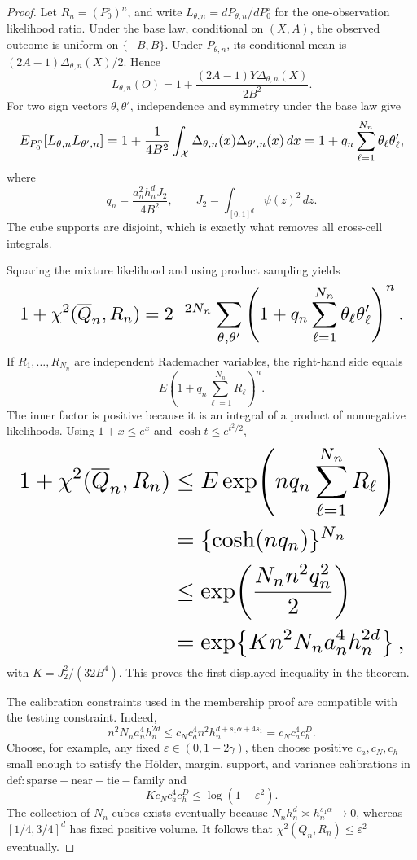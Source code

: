 \documentclass{article}
\begin{document}
\begin{proof}
Let \(R_n=(P_0^\circ)^n\), and write \(L_{\theta,n}=dP_{\theta,n}/dP_0^\circ\) for the one-observation likelihood ratio.  Under the base law, conditional on \((X,A)\), the observed outcome is uniform on \(\{-B,B\}\).  Under \(P_{\theta,n}\), its conditional mean is \((2A-1)\Delta_{\theta,n}(X)/2\).  Hence
\[
 L_{\theta,n}(O)
 =1+\frac{(2A-1)Y\Delta_{\theta,n}(X)}{2B^2}.
\]
For two sign vectors \(\theta,\theta'\), independence and symmetry under the base law give
\[
\makebox[\linewidth][c]{\resizebox{0.98\linewidth}{!}{\(\displaystyle E_{P_0^\circ}[L_{\theta,n}L_{\theta',n}]
 =1+\frac1{4B^2}\int_{\mathcal X}
 \Delta_{\theta,n}(x)\Delta_{\theta',n}(x)\,dx
 =1+q_n\sum_{\ell=1}^{N_n}\theta_\ell\theta'_\ell,\)}}
\]
where
\[
 q_n=\frac{a_n^2h_n^dJ_2}{4B^2},
 \qquad
 J_2=\int_{[0,1]^d}\psi(z)^2\,dz.
\]
The cube supports are disjoint, which is exactly what removes all cross-cell integrals.

Squaring the mixture likelihood and using product sampling yields
\[
\makebox[\linewidth][c]{\resizebox{0.98\linewidth}{!}{\(\displaystyle 1+\chi^2(\overline Q_n,R_n)
 =2^{-2N_n}\sum_{\theta,\theta'}
 \left(1+q_n\sum_{\ell=1}^{N_n}\theta_\ell\theta'_\ell\right)^n.\)}}
\]
If \(R_1,\ldots,R_{N_n}\) are independent Rademacher variables, the right-hand side equals
\[
 E\left(1+q_n\sum_{\ell=1}^{N_n}R_\ell\right)^n.
\]
The inner factor is positive because it is an integral of a product of nonnegative likelihoods.  Using \(1+x\le e^x\) and \(\cosh t\le e^{t^2/2}\),
\[
\makebox[\linewidth][c]{\resizebox{0.98\linewidth}{!}{\(\displaystyle \begin{aligned}
 1+\chi^2(\overline Q_n,R_n)
 &\le E\exp\!\left(nq_n\sum_{\ell=1}^{N_n}R_\ell\right)\\
 &=\{\cosh(nq_n)\}^{N_n}\\
 &\le\exp\!\left(\frac{N_nn^2q_n^2}{2}\right)\\
 &=\exp\!\left\{K n^2N_na_n^4h_n^{2d}\right\},
 \end{aligned}\)}}
\]
with \(K=J_2^2/(32B^4)\).  This proves the first displayed inequality in the theorem.

The calibration constraints used in the membership proof are compatible with the testing constraint.  Indeed,
\[
 n^2N_na_n^4h_n^{2d}
 \le c_Nc_a^4n^2h_n^{d+s_1\alpha+4s_1}
 =c_Nc_a^4c_h^{D}.
\]
Choose, for example, any fixed \(\varepsilon\in(0,1-2\gamma)\), then choose positive \(c_a,c_N,c_h\) small enough to satisfy the Hölder, margin, support, and variance calibrations in \(\mathrm{def:sparse-near-tie-family}\) and
\[
 Kc_Nc_a^4c_h^D\le\log(1+\varepsilon^2).
\]
The collection of \(N_n\) cubes exists eventually because \(N_nh_n^d\asymp h_n^{s_1\alpha}\to0\), whereas \([1/4,3/4]^d\) has fixed positive volume.  It follows that \(\chi^2(\overline Q_n,R_n)\le\varepsilon^2\) eventually.


\end{proof}
\end{document}
